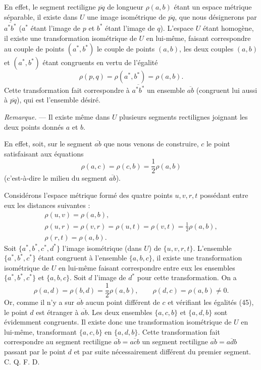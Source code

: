 \documentclass[a4paper,12pt]{amsart}
\newcommand{\srcpage}[1]{} %
\begin{document}
En effet, le segment rectiligne $\overline{pq}$ de longueur $\rho(a,b)$ étant un espace métrique séparable, il existe dans $U$ une image isométrique de $\overline{pq}$, que nous désignerons par $\overline{a^*b^*}$ ($a^*$ étant l'image de $p$ et $b^*$ étant l'image de $q$). L'espace $U$ étant homogène, il existe une transformation isométrique de $U$ en lui-même, faisant correspondre au couple de points $(a^*,b^*)$ le couple de points $(a,b)$, les deux couples $(a,b)$ et $(a^*,b^*)$ étant congruents en vertu de l'égalité
\[
\rho(p,q)=\rho(a^*,b^*)=\rho(a,b).
\]
Cette transformation fait correspondre à $\overline{a^*b^*}$ un ensemble $\overline{ab}$ (congruent lui aussi à $\overline{pq}$), qui est l'ensemble désiré.

\textit{Remarque.} --- Il existe même dans $U$ plusieurs segments rectilignes joignant les deux points donnés $a$ et $b$.

\srcpage{82}
En effet, soit, sur le segment $\overline{ab}$ que nous venons de construire, $c$ le point satisfaisant aux équations
\begin{equation}\rho(a,c)=\rho(c,b)=\frac12\rho(a,b)\tag{45}\end{equation}
(c'est-à-dire le milieu du segment $\overline{ab}$).

Considérons l'espace métrique formé des quatre points $u,v,r,t$ possédant entre eux les distances suivantes :
\[
\begin{gathered}
\rho(u,v)=\rho(a,b),\\
\rho(u,r)=\rho(v,r)=\rho(u,t)=\rho(v,t)=\frac12\rho(a,b),\\
\rho(r,t)=\rho(a,b).
\end{gathered}
\]
Soit $\{a^*,b^*,c^*,d^*\}$ l'image isométrique (dans $U$) de $\{u,v,r,t\}$. L'ensemble $\{a^*,b^*,c^*\}$ étant congruent à l'ensemble $\{a,b,c\}$, il existe une transformation isométrique de $U$ en lui-même faisant correspondre entre eux les ensembles $\{a^*,b^*,c^*\}$ et $\{a,b,c\}$. Soit $d$ l'image de $d^*$ pour cette transformation. On a
\[
\rho(a,d)=\rho(b,d)=\frac12\rho(a,b),\qquad \rho(d,c)=\rho(a,b)\ne0.
\]
Or, comme il n'y a sur $\overline{ab}$ aucun point différent de $c$ et vérifiant les égalités (45), le point $d$ est étranger à $\overline{ab}$. Les deux ensembles $\{a,c,b\}$ et $\{a,d,b\}$ sont évidemment congruents. Il existe donc une transformation isométrique de $U$ en lui-même, transformant $\{a,c,b\}$ en $\{a,d,b\}$. Cette transformation fait correspondre au segment rectiligne $\overline{ab}=\overline{acb}$ un segment rectiligne $\overline{ab}=\overline{adb}$ passant par le point $d$ et par suite nécessairement différent du premier segment. \hfill C. Q. F. D.
\end{document}
